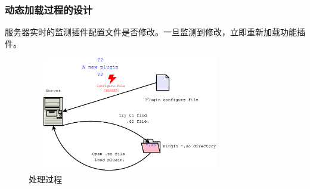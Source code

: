 \documentclass[10pt,dvipdfm]{beamer}
\begin{document}
\begin{frame}
	\frametitle{动态加载过程的设计}
	
	服务器实时的监测插件配置文件是否修改。一旦监测到修改，立即重新加载功能插件。

	\begin{figure}[htbp]
	\centering
	\includegraphics[height=5cm, width=9cm]{pics/loadplugin.eps}
	\caption{处理过程}
	\end{figure}

\end{frame}
\end{document}
